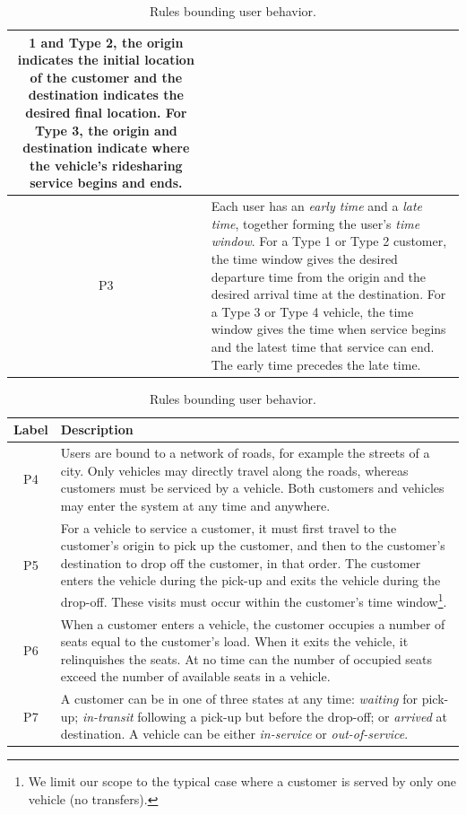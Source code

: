 \documentclass{article}
\newcommand{\hi}[1]{\noindent {\bf #1}}     %
\theoremstyle{definition}                   %
\begin{document}
\begin{table}[h]
\begin{tabular}{|c|p{140mm}|}
1 and Type 2, the origin indicates the initial location of the customer
and the destination indicates the desired final location.  For Type 3, the
origin and destination indicate where the vehicle's ridesharing service begins
and ends.\\
\hline
P3 & \hi{Time Window.} Each user has an \emph{early time} and a
\emph{late time}, together forming the user's \emph{time window}. For a Type 1
or Type 2 customer, the time window gives the desired departure time from the
origin and the desired arrival time at the destination.  For a Type 3 or Type 4
vehicle, the time window gives the time when service begins and the latest time
that service can end. The early time precedes the late time.\\
\hline
\end{tabular}
\caption{Rules bounding user behavior.}
\label{tab:user-rules}
\begin{tabular}{|c|p{140mm}|}
\hline
Label & Description \\
\hline
P4 & \hi{Motion.} Users are bound to a network of roads, for
example the streets of a city. Only vehicles may directly travel along the
roads, whereas customers must be serviced by a vehicle. Both customers and
vehicles may enter the system at any time and anywhere.\\
\hline
P5 & \hi{Pick-ups and Drop-offs.} For a vehicle to service a customer, it
must first travel to the customer's origin to pick up the customer, and then to
the customer's destination to drop off the customer, in that order. The
customer enters the vehicle during the pick-up and exits the vehicle during the
drop-off. These visits must occur within the customer's time window\footnote{We
limit our scope to the typical case where a customer is served by only one
vehicle (no transfers).}.\\
\hline
P6 & \hi{Vehicle Seats.} When a customer enters a vehicle, the customer
occupies a number of seats equal to the customer's load. When it exits the
vehicle, it relinquishes the seats. At no time can the number of occupied seats
exceed the number of available seats in a vehicle.\\
\hline
P7 & \hi{User States.} A customer can be in one of three states at any
time: \emph{waiting} for pick-up; \emph{in-transit} following a pick-up but
before the drop-off; or \emph{arrived} at destination. A vehicle can be either
\emph{in-service} or \emph{out-of-service}.\\
\hline
\end{tabular}
\end{table}
\end{document}
